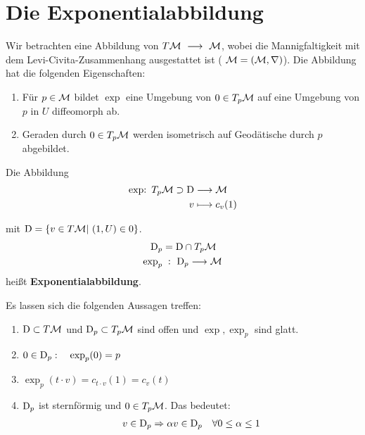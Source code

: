 \section{Die Exponentialabbildung}
Wir betrachten eine Abbildung von $T\mfk \ \longrightarrow \ \mfk $, wobei die Mannigfaltigkeit mit dem Levi-Civita-Zusammenhang ausgestattet ist ( $\mathcal{M} = ( \mathcal{M}, \nabla) $). Die Abbildung hat die folgenden Eigenschaften:

\begin{enumerate}
\item Für $p \in \mathcal{M} $ bildet $\operatorname{exp}$ eine Umgebung von $0 \in T_p\mathcal{M}$ auf eine Umgebung von $p$ in $U$ diffeomorph ab.
\item Geraden durch $0 \in T_p\mathcal{M}$ werden isometrisch auf Geodätische durch $p$ abgebildet.
\end{enumerate}

\begin{defs}[Exponentialabbildung]
Die Abbildung
\begin{align*}
\operatorname{exp:} \ T_p\mathcal{M} \supset \mathrm{D}&\longrightarrow \mathcal{M} \\
									v &\longmapsto c_v(1) 
\end{align*}

mit $\mathrm{D} = \{ v \in T\mathcal{M} | \ (1,U) \in 0\}$.
\begin{align*}
\mathrm{D}_p &= \mathrm{D} \cap T_p\mathcal{M} \\
\operatorname{exp}_p &\phantom{:}: \ \mathrm{D}_p \longrightarrow \mathcal{M}
\end{align*}
heißt \textbf{Exponentialabbildung}.
\end{defs}

\begin{bem}
Es lassen sich die folgenden Aussagen treffen: 
\begin{enumerate}
\item $\mathrm{D} \subset T\mathcal{M}$ und  $\mathrm{D}_p \subset T_p\mathcal{M}$ sind offen und $\operatorname{exp}, \operatorname{exp}_p$ sind glatt.
\item $0 \in \mathrm{D}_p: \quad \operatorname{exp}_p(0) = p$
\item $\operatorname{exp}_p(t\cdot v) = c_{t\cdot v}(1) = c_v(t)$
\item $\mathrm{D}_p$ ist sternförmig und $0 \in T_p\mathcal{M}$. 
Das bedeutet:
\begin{align*}
v \in \mathrm{D}_p \Rightarrow \alpha v \in \mathrm{D}_p \quad \forall 0 \leq \alpha \leq 1
\end{align*}
\end{enumerate}
\end{bem}

